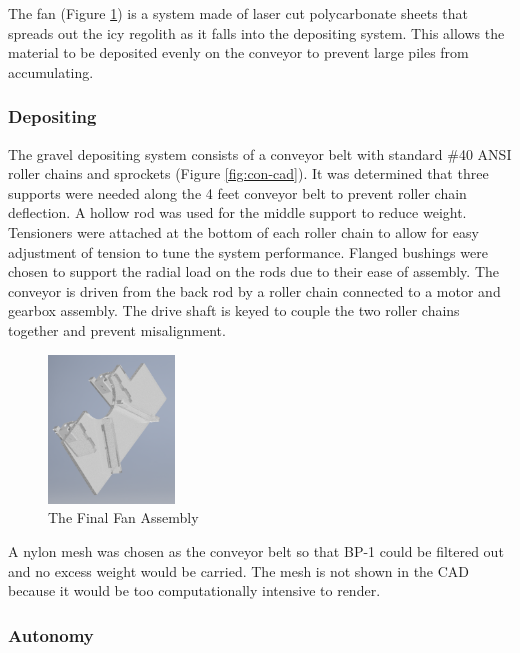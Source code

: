 \documentclass[class=article, crop=false]{standalone}
\begin{document}
	The fan (Figure \ref{fig:fan-cad}) is a system made of laser cut polycarbonate sheets that spreads out the icy regolith as it falls into the depositing system. This allows the material to be deposited evenly on the conveyor to prevent large piles from accumulating.
	
	
	\subsubsection{Depositing}
	
	The gravel depositing system consists of a conveyor belt with standard \#40 ANSI roller chains and sprockets (Figure \ref{fig:con-cad}). It was determined that three supports were needed along the 4 feet conveyor belt to prevent roller chain deflection. A hollow rod was used for the middle support to reduce weight. Tensioners were attached at the bottom of each roller chain to allow for easy adjustment of tension to tune the system performance. Flanged bushings were chosen to support the radial load on the rods due to their ease of assembly. The conveyor is driven from the back rod by a roller chain connected to a motor and gearbox assembly. The drive shaft is keyed to couple the two roller chains together and prevent misalignment. 
	
	\begin{figure}
	\centering
	 \includegraphics[width=0.3\textwidth]{09_Figures/fan-cad.jpg}
	 \caption{The Final Fan Assembly}
	 \label{fig:fan-cad}
	\end{figure}
	
	A nylon mesh was chosen as the conveyor belt so that BP-1 could be filtered out and no excess weight would be carried. The mesh is not shown in the CAD because it would be too computationally intensive to render.
	
	
	\subsubsection{Autonomy}
	
\end{document}
